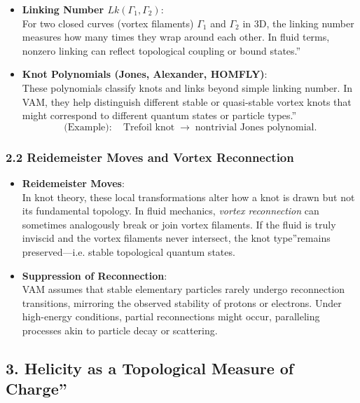 \begin{itemize}
    \item \textbf{Linking Number \(Lk(\Gamma_1, \Gamma_2)\)}: \\
    For two closed curves (vortex filaments) \(\Gamma_1\) and \(\Gamma_2\) in 3D, the linking number measures how many times they wrap around each other. In fluid terms, nonzero linking can reflect topological coupling or \grqq bound states.\textquotedblright
    \item \textbf{Knot Polynomials (Jones, Alexander, HOMFLY)}: \\
    These polynomials classify knots and links beyond simple linking number. In VAM, they help distinguish different stable or quasi-stable vortex knots that might correspond to different quantum states or particle \grqq types.\textquotedblright
    \[
        \text{(Example)}:\quad
        \text{Trefoil knot}\;\longrightarrow\;\text{nontrivial Jones polynomial.}
    \]
\end{itemize}

\subsubsection*{2.2 Reidemeister Moves and Vortex Reconnection}

\begin{itemize}
    \item \textbf{Reidemeister Moves}: \\
    In knot theory, these local transformations alter how a knot is drawn but not its fundamental topology. In fluid mechanics, \textit{vortex reconnection} can sometimes analogously break or join vortex filaments. If the fluid is truly inviscid and the vortex filaments never intersect, the \grqq knot type\textquotedblright remains preserved—i.e. stable topological quantum states.
    \item \textbf{Suppression of Reconnection}: \\
    VAM assumes that stable elementary particles rarely undergo reconnection transitions, mirroring the observed stability of protons or electrons. Under high-energy conditions, partial reconnections might occur, paralleling processes akin to particle decay or scattering.
\end{itemize}

\subsection*{3. Helicity as a Topological Measure of \grqq Charge\textquotedblright}

